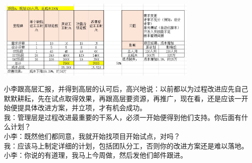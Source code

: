 \includegraphics[width=10cm]{JiangJingFinal2presentScreenshot20220912092535.jpg}

小李跟高层汇报，并得到高层的认可后，高兴地说：以前都以为过程改进应先自己默默耕耘，先在试点取得效果，再跟高层要资源，再推广，现在看，还是应该一开始便提具体改进方案，并立项，才有机会成功。\\
我：管理层是过程改进最重要的干系人，必须一开始便得到他们支持。你后面有什么计划？\\
小李：既然他们都同意，我就开始找项目开始试点，对吗？\\
我：应该马上制定详细的计划，包括团队分工，否则你的改进方案还是难以落地。\\
小李：你说的有道理，我马上今周做，然后发他们邮件跟进。\\


